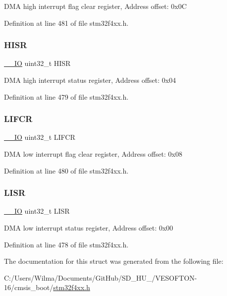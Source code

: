 D\+MA high interrupt flag clear register, Address offset\+: 0x0C 

Definition at line 481 of file stm32f4xx.\+h.

\mbox{\label{struct_d_m_a___type_def_a6fe40f7ac1a18c2726b328b5ec02b262}} 
\subsubsection{\texorpdfstring{H\+I\+SR}{HISR}}
{\footnotesize\ttfamily \hyperlink{group___c_m_s_i_s__core__definitions_gaec43007d9998a0a0e01faede4133d6be}{\+\_\+\+\_\+\+IO} uint32\+\_\+t H\+I\+SR}

D\+MA high interrupt status register, Address offset\+: 0x04 

Definition at line 479 of file stm32f4xx.\+h.

\mbox{\label{struct_d_m_a___type_def_ac4f7bf4cb172024bfc940c00167cd04e}} 
\subsubsection{\texorpdfstring{L\+I\+F\+CR}{LIFCR}}
{\footnotesize\ttfamily \hyperlink{group___c_m_s_i_s__core__definitions_gaec43007d9998a0a0e01faede4133d6be}{\+\_\+\+\_\+\+IO} uint32\+\_\+t L\+I\+F\+CR}

D\+MA low interrupt flag clear register, Address offset\+: 0x08 

Definition at line 480 of file stm32f4xx.\+h.

\mbox{\label{struct_d_m_a___type_def_a5cdef358e9e95b570358e1f6a3a7f492}} 
\subsubsection{\texorpdfstring{L\+I\+SR}{LISR}}
{\footnotesize\ttfamily \hyperlink{group___c_m_s_i_s__core__definitions_gaec43007d9998a0a0e01faede4133d6be}{\+\_\+\+\_\+\+IO} uint32\+\_\+t L\+I\+SR}

D\+MA low interrupt status register, Address offset\+: 0x00 

Definition at line 478 of file stm32f4xx.\+h.



The documentation for this struct was generated from the following file\+:\begin{DoxyCompactItemize}
\item 
C\+:/\+Users/\+Wilma/\+Documents/\+Git\+Hub/\+S\+D\+\_\+\+H\+U\+\_/\+V\+E\+S\+O\+F\+T\+O\+N-\/16/cmsis\+\_\+boot/\hyperlink{stm32f4xx_8h}{stm32f4xx.\+h}\end{DoxyCompactItemize}

